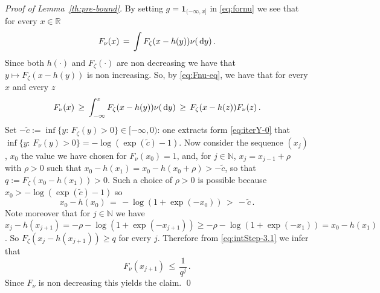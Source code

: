 \documentclass[reqno,11pt]{amsart}
\numberwithin{equation}{section}
\newcommand{\ind}{\mathbf{1}}
\renewcommand{\tilde}{\widetilde}
\newcommand{\dd}{\,\text{\rm d}}             %
\newcommand{\bbN}{{\ensuremath{\mathbb N}} }
\newcommand{\bbR}{{\ensuremath{\mathbb R}} }
\newcommand{\gz}{\zeta}
\begin{document}
\medskip

\noindent
\emph{Proof of Lemma~\ref{th:pre-bound}.} 
By setting $g=\ind_{(-\infty, x]}$ in \eqref{eq:fornu} we see that for every $x \in \bbR$
\begin{equation}
\label{eq:Fnu-eq}
F_\nu(x)\, =\, \int F_{\gz} (x-h(y)) \nu (\dd y)\, .
\end{equation}
Since both $h(\cdot)$ and $F_{\gz}(\cdot)$ are non decreasing we have that
$y \mapsto F_{\gz}(x-h(y))$ is non increasing. So, by  
\eqref{eq:Fnu-eq}, we have that for every $x$ and every $z$ 
\begin{equation}
\label{eq:intStep-3.1}
F_\nu(x)\, \ge \, \int_{-\infty} ^z F_{\gz}(x-h(y)) \nu(\dd y) \, \ge \, F_{\gz}(x-h(z)) F_\nu(z)\, .
\end{equation}
Set $-\tilde c:= \inf\{y:\, F_\zeta(y)>0\} \in [-\infty, 0)$: one extracts form \eqref{eq:iterY-0} that $ \inf\{y:\, F_\nu(y)>0\}= -\log (\exp(\tilde c)-1)$.
Now consider the sequence $(x_j)$, $x_0$ the value we have chosen for $F_\nu(x_0)=1$,
and, for $j\in \bbN$, $x_{j}= x_{j-1}+ \rho$ with $\rho>0$ such that 
$x_0-h(x_1)=x_0-h(x_0+ \rho)> - \tilde c$, 
so that $q:= F_{\gz} (x_0-h(x_1)) >0$. Such a choice of $\rho>0$ is possible because $x_0>  -\log (\exp(\tilde c)-1)$ so
\begin{equation}
x_0-h(x_0)\, =\,  -\log(1+ \exp(-x_0))\, >\, - \tilde c\,.
\end{equation}
 Note moreover that for $j\in \bbN$ we have
$x_j -h(x_{j+1})= -\rho -\log(1+ \exp(-x_{j+1})) \ge -\rho -\log(1+ \exp(-x_{1}))= x_0-h(x_1)$.
So $F_{\gz} (x_j-h(x_{j+1})) \ge q$ for every $j$.
Therefore from  \eqref{eq:intStep-3.1} we infer that 
\begin{equation}
{F_\nu(x_{j+1})}\, \le \, \frac 1 {q^j} \, .
\end{equation}
Since $F_\nu$ is non decreasing this yields the claim.
\qed
\end{document}
